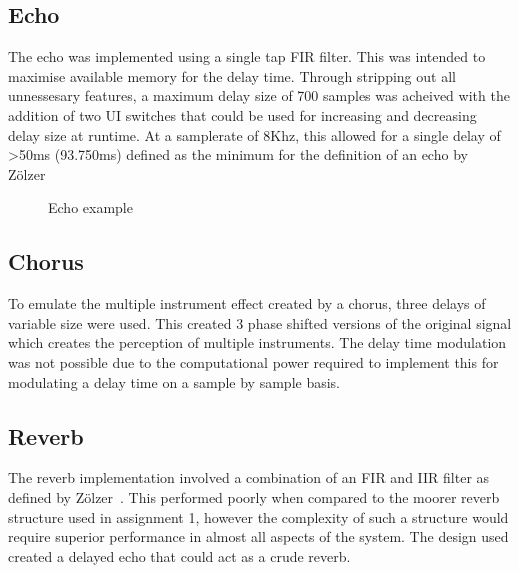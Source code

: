 \documentclass[titlepage]{scrartcl}
\begin{document}
    \subsection{Echo}
    The echo was implemented using a single tap FIR filter. This was intended
    to maximise available memory for the delay time. Through stripping out all
    unnessesary features, a maximum delay size of 700 samples was acheived with
    the addition of two UI switches that could be used for increasing and
    decreasing delay size at runtime.  At a samplerate of 8Khz, this allowed
    for a single delay of \textgreater50ms (93.750ms) defined as the minimum
    for the definition of an echo
    by Z{\"o}lzer~\citeyearpar[p.]{zolzer2011dafx}

    \begin{figure}[H]
        \caption{Echo example}
    \end{figure}

    \subsection{Chorus}
    To emulate the multiple instrument effect created by a chorus, three delays
    of variable size were used. This created 3 phase shifted versions of the
    original signal which creates the perception of multiple instruments. The
    delay time modulation was not possible due to the computational power
    required to implement this for modulating a delay time on a sample by
    sample basis.

    \subsection{Reverb}
    The reverb implementation involved a combination of an FIR and IIR filter
    as defined by Z{\"o}lzer~\citeyearpar{zolzer2011dafx}. This performed
    poorly when compared to the moorer reverb structure used in assignment 1,
    however the complexity of such a structure would require superior
    performance in almost all aspects of the system.
    The design used created a delayed echo that could act as a crude reverb.
\end{document}
